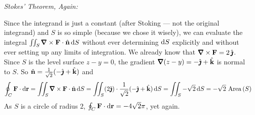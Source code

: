 \begin{eg}
\medskip
\noindent
\emph{Stokes' Theorem, Again:}

\noindent
Since the integrand is just a constant (after Stoking --- not the original integrand) and $S$ is so simple (because we chose it wisely), we can evaluate 
the integral $\dblInt_S \vnabla\times\vF\cdot\hn\,\dee{S}$ without ever determining
$\mathrm{d}S$ explicitly and without ever setting up any limits of integration.
We already know that $\vnabla\times\vF=2\,\hj$. Since $S$ is the level
surface $z-y=0$, the gradient $\vnabla(z-y)=-\hj+\hk$ is normal to $S$.
So $\hat{\mathbf{n}} = \frac{1}{\sqrt{2}}(-\hat{\pmb{\jmath}}+\hat{\mathbf{k}})$ and
\begin{equation*}
\oint_C\vF\cdot \dee{\vr}
=\dblInt_S \vnabla\times\vF\cdot\hn\,\dee{S}
=\dblInt_S (2\hj)\cdot \frac{1}{\sqrt{2}}(-\hj+\hk)\,\dee{S}
=\dblInt_S -\sqrt{2}\,\dee{S}
=-\sqrt{2}\ {\rm Area}\,(S)
\end{equation*}
As $S$ is a circle of radius $2$, $\oint_C\mathbf{F}\cdot \mathrm{d}\mathbf{r}=-4\sqrt{2}\pi$,
yet again.

\end{eg}



